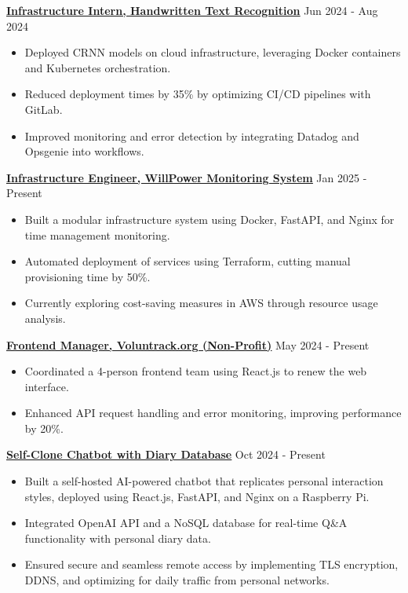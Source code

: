 \documentclass[a4paper,10pt]{article}
\begin{document}
\noindent\href{https://github.com/Ken-2511/HandwritingRecognition}{\uline{
\textbf{Infrastructure Intern, Handwritten Text Recognition}}} \hfill Jun 2024 - Aug 2024
\begin{itemize}[leftmargin=0.2in]
    \item Deployed CRNN models on cloud infrastructure, leveraging Docker containers and Kubernetes orchestration.
    \item Reduced deployment times by 35\% by optimizing CI/CD pipelines with GitLab.
    \item Improved monitoring and error detection by integrating Datadog and Opsgenie into workflows.
\end{itemize}

\vspace{0.3cm}
\noindent\href{https://github.com/Ken-2511/WillPower}{\uline{
\textbf{Infrastructure Engineer, WillPower Monitoring System}}} \hfill Jan 2025 - Present
\begin{itemize}[leftmargin=0.2in]
    \item Built a modular infrastructure system using Docker, FastAPI, and Nginx for time management monitoring.
    \item Automated deployment of services using Terraform, cutting manual provisioning time by 50\%.
    \item Currently exploring cost-saving measures in AWS through resource usage analysis.
\end{itemize}

\vspace{0.3cm}
\noindent\href{https://github.com/VolunTrack/Web}{\uline{
\textbf{Frontend Manager, Voluntrack.org (Non-Profit)}}} \hfill May 2024 - Present
\begin{itemize}[leftmargin=0.2in]
    \item Coordinated a 4-person frontend team using React.js to renew the web interface.
    \item Enhanced API request handling and error monitoring, improving performance by 20\%.
\end{itemize}

\vspace{0.3cm}
\noindent\href{https://chengyongkang.me/chat}{\uline{
\textbf{Self-Clone Chatbot with Diary Database}}} \hfill Oct 2024 - Present
\begin{itemize}[leftmargin=0.2in]
    \item Built a self-hosted AI-powered chatbot that replicates personal interaction styles, deployed using React.js, FastAPI, and Nginx on a Raspberry Pi.
    \item Integrated OpenAI API and a NoSQL database for real-time Q\&A functionality with personal diary data.
    \item Ensured secure and seamless remote access by implementing TLS encryption, DDNS, and optimizing for daily traffic from personal networks.
\end{itemize}
\end{document}
